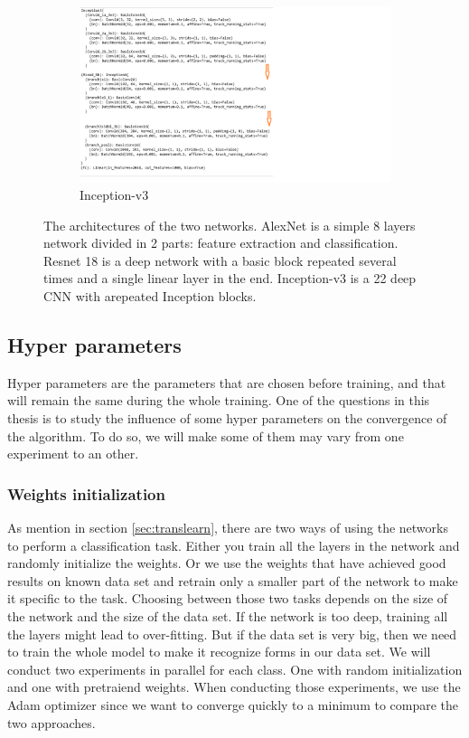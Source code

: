 \begin{figure}
\begin{subfigure}{.5\textwidth}
  \includegraphics[width=.8\linewidth]{figures/03_inception_architecture}
  \caption{Inception-v3}
  \label{fig:googarch}
\end{subfigure}
\caption[Networks architectures]{The architectures of the two networks. AlexNet is a simple 8 layers network divided in 2 parts: feature extraction and classification. Resnet 18 is a deep network with a basic block repeated several times and a single linear layer in the end. Inception-v3 is a 22 deep CNN with arepeated Inception blocks.}
\end{figure}

\subsection{Hyper parameters}
Hyper parameters are the parameters that are chosen before training, and that will remain the same during the whole training. One of the questions in this thesis is to study the influence of some hyper parameters on the  convergence of the algorithm. To do so, we will make some of them may vary from one experiment to an other. 


\subsubsection{Weights initialization}
As mention in section \ref{sec:translearn}, there are two ways of using the networks to perform a classification task. Either you train all the layers in the network and randomly initialize the weights. Or we use the weights that have achieved good results on known data set and retrain only a smaller part of the network to make it specific to the task.
Choosing between those two tasks depends on the size of the network and the size of the data set. If the network is too deep, training all the layers might lead to over-fitting. But if the data set is very big, then we need to train the whole model to make it recognize forms in our data set. 
We will conduct two experiments in parallel for each class. One with random initialization and one with pretraiend weights. 
When conducting those experiments, we use the Adam optimizer since we want to converge quickly to a minimum to compare the two approaches. 

